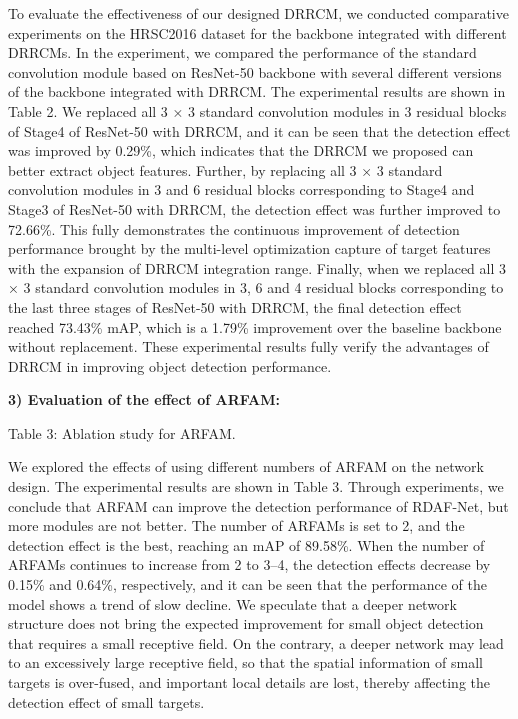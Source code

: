 \documentclass[journal]{IEEEtran}
\begin{document}
To evaluate the effectiveness of our designed DRRCM, we conducted comparative experiments on the HRSC2016 dataset for the backbone integrated with different DRRCMs. In the experiment, we compared the performance of the standard convolution module based on ResNet-50 backbone with several different versions of the backbone integrated with DRRCM. The experimental results are shown in Table 2. We replaced all 3 × 3 standard convolution modules in 3 residual blocks of Stage4 of ResNet-50 with DRRCM, and it can be seen that the detection effect was improved by 0.29\%, which indicates that the DRRCM we proposed can better extract object features. Further, by replacing all 3 × 3 standard convolution modules in 3 and 6 residual blocks corresponding to Stage4 and Stage3 of ResNet-50 with DRRCM, the detection effect was further improved to 72.66\%. This fully demonstrates the continuous improvement of detection performance brought by the multi-level optimization capture of target features with the expansion of DRRCM integration range. Finally, when we replaced all 3 × 3 standard convolution modules in 3, 6 and 4 residual blocks corresponding to the last three stages of ResNet-50 with DRRCM, the final detection effect reached 73.43\% mAP, which is a 1.79\% improvement over the baseline backbone without replacement. These experimental results fully verify the advantages of DRRCM in improving object detection performance.

\textbf{3) Evaluation of the effect of ARFAM:}

Table 3: Ablation study for ARFAM.

We explored the effects of using different numbers of ARFAM on the network design. The experimental results are shown in Table 3. Through experiments, we conclude that ARFAM can improve the detection performance of RDAF-Net, but more modules are not better. The number of ARFAMs is set to 2, and the detection effect is the best, reaching an mAP of 89.58\%. When the number of ARFAMs continues to increase from 2 to 3–4, the detection effects decrease by 0.15\% and 0.64\%, respectively, and it can be seen that the performance of the model shows a trend of slow decline. We speculate that a deeper network structure does not bring the expected improvement for small object detection that requires a small receptive field. On the contrary, a deeper network may lead to an excessively large receptive field, so that the spatial information of small targets is over-fused, and important local details are lost, thereby affecting the detection effect of small targets.
\end{document}

